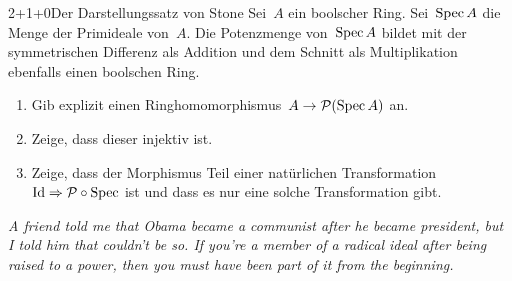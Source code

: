 \documentclass{uebblatt}
\begin{document}
\begin{aufgabe}{2+1+0}{Der Darstellungssatz von Stone}
Sei~$A$ ein boolscher Ring. Sei~$\operatorname{Spec} A$ die Menge der Primideale von~$A$. Die
Potenzmenge von~$\operatorname{Spec} A$ bildet mit der symmetrischen Differenz als Addition
und dem Schnitt als Multiplikation ebenfalls einen boolschen Ring.
\begin{enumerate}
\item Gib explizit einen Ringhomomorphismus~$A \to \mathcal{P}(\operatorname{Spec} A)$ an.
\item Zeige, dass dieser injektiv ist.
\item Zeige, dass der Morphismus Teil einer natürlichen Transformation~$\mathrm{Id}
\Rightarrow \mathcal{P} \circ \operatorname{Spec}$ ist und dass es nur eine solche Transformation
gibt.
\end{enumerate}
\end{aufgabe}

\centering
\emph{A friend told me that Obama became a communist after he became
president, but I told him that couldn't be so. If you're a member of a
radical ideal after being raised to a power, then you must have been
part of it from the beginning.}
\par
\end{document}
